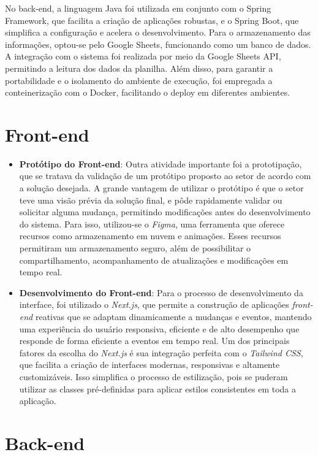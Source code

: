 No back-end, a linguagem Java foi utilizada em conjunto com o Spring Framework, que facilita a criação de aplicações robustas, e o Spring Boot, que simplifica a configuração e acelera o desenvolvimento. Para o armazenamento das informações, optou-se pelo Google Sheets, funcionando como um banco de dados. A integração com o sistema foi realizada por meio da Google Sheets API, permitindo a leitura dos dados da planilha. Além disso, para garantir a portabilidade e o isolamento do ambiente de execução, foi empregada a conteinerização com o Docker, facilitando o deploy em diferentes ambientes.

\section{Front-end}

\begin{itemize}
    \item \textbf{Protótipo do Front-end}: Outra atividade importante foi a prototipação, que se tratava da validação de um protótipo proposto ao setor de acordo com a solução desejada. A grande vantagem de utilizar o protótipo é que o setor teve uma visão prévia da solução final, e pôde rapidamente validar ou solicitar alguma mudança, permitindo modificações antes do desenvolvimento do sistema. Para isso, utilizou-se o \textit{Figma}, uma ferramenta que oferece recursos como armazenamento em nuvem e animações. Esses recursos permitiram um armazenamento seguro, além de possibilitar o compartilhamento, acompanhamento de atualizações e modificações em tempo real.
    
    \item \textbf{Desenvolvimento do Front-end}: Para o processo de desenvolvimento da interface, foi utilizado o \textit{Next.js}, que permite a construção de aplicações \textit{front-end} reativas que se adaptam dinamicamente a mudanças e eventos, mantendo uma experiência do usuário responsiva, eficiente e de alto desempenho que responde de forma eficiente a eventos em tempo real. Um dos principais fatores da escolha do \textit{Next.js} é sua integração perfeita com o \textit{Tailwind CSS}, que facilita a criação de interfaces modernas, responsivas e altamente customizáveis. Isso simplifica o processo de estilização, pois se puderam utilizar as classes pré-definidas para aplicar estilos consistentes em toda a aplicação.
\end{itemize}

\section{Back-end}


